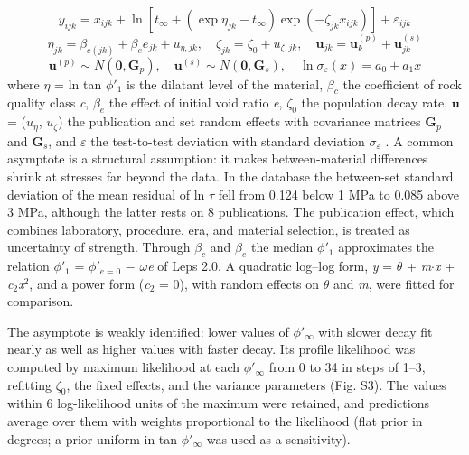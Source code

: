 \documentclass[Journal,letterpaper]{ascelike-new}
\begin{document}
\begin{equation}
y_{ijk}=x_{ijk}+\ln\!\left[t_\infty+\left(\exp\eta_{jk}-t_\infty\right)\exp\!\left(-\zeta_{jk}x_{ijk}\right)\right]+\varepsilon_{ijk}
\end{equation}
\begin{equation}
\eta_{jk}=\beta_{c(jk)}+\beta_e e_{jk}+u_{\eta,jk},\quad \zeta_{jk}=\zeta_0+u_{\zeta,jk},\quad \mathbf{u}_{jk}=\mathbf{u}^{(p)}_k+\mathbf{u}^{(s)}_{jk}
\end{equation}
\begin{equation}
\mathbf{u}^{(p)}\sim N(\mathbf{0},\mathbf{G}_p),\quad \mathbf{u}^{(s)}\sim N(\mathbf{0},\mathbf{G}_s),\quad \ln\sigma_\varepsilon(x)=a_0+a_1x
\end{equation}
\noindent where $\eta$ = ln tan $\phi'_1$ is the dilatant level of the material, $\beta_c$ the coefficient of rock quality class \textit{c}, $\beta_e$ the effect of initial void ratio \textit{e}, $\zeta_0$ the population decay rate, $\mathbf{u}$ = ($u_\eta$, $u_\zeta$) the publication and set random effects with covariance matrices $\mathbf{G}_p$ and $\mathbf{G}_s$, and $\varepsilon$ the test-to-test deviation with standard deviation $\sigma_\varepsilon$ \cite{laird1982}. A common asymptote is a structural assumption: it makes between-material differences shrink at stresses far beyond the data. In the database the between-set standard deviation of the mean residual of ln $\tau$ fell from 0.124 below 1 MPa to 0.085 above 3 MPa, although the latter rests on 8 publications. The publication effect, which combines laboratory, procedure, era, and material selection, is treated as uncertainty of strength. Through $\beta_c$ and $\beta_e$ the median $\phi'_1$ approximates the relation $\phi'_1$ = $\phi'_{e=0}$ $-$ $\omega$\textit{e} of Leps 2.0. A quadratic log--log form, \textit{y} = $\theta$ + \textit{m}$\cdot$\textit{x} + \textit{c}$_{2}$\textit{x}$^{2}$, and a power form (\textit{c}$_{2}$ = 0), with random effects on $\theta$ and \textit{m}, were fitted for comparison.

The asymptote is weakly identified: lower values of $\phi'_\infty$ with slower decay fit nearly as well as higher values with faster decay. Its profile likelihood was computed by maximum likelihood at each $\phi'_\infty$ from 0\textdegree{} to 34\textdegree{} in steps of 1--3\textdegree{}, refitting $\zeta_0$, the fixed effects, and the variance parameters (Fig. S3). The values within 6 log-likelihood units of the maximum were retained, and predictions average over them with weights proportional to the likelihood (flat prior in degrees; a prior uniform in tan $\phi'_\infty$ was used as a sensitivity).
\end{document}
